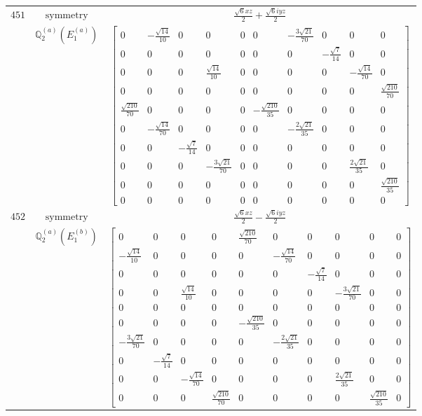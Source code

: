 \documentclass[fleqn,8pt,landscape]{jsarticle}
\begin{document}
\begin{longtable}{ccc}
$ 451 $ & $ \text{symmetry} $ & $ \frac{\sqrt{6} x z}{2} + \frac{\sqrt{6} i y z}{2} $ \\
$  $ & $ \mathbb{Q}_{2}^{(a)}(E_{1}^{(a)}) $ & $ \begin{bmatrix} 0 & - \frac{\sqrt{14}}{10} & 0 & 0 & 0 & 0 & - \frac{3 \sqrt{21}}{70} & 0 & 0 & 0 \\ 0 & 0 & 0 & 0 & 0 & 0 & 0 & - \frac{\sqrt{7}}{14} & 0 & 0 \\ 0 & 0 & 0 & \frac{\sqrt{14}}{10} & 0 & 0 & 0 & 0 & - \frac{\sqrt{14}}{70} & 0 \\ 0 & 0 & 0 & 0 & 0 & 0 & 0 & 0 & 0 & \frac{\sqrt{210}}{70} \\ \frac{\sqrt{210}}{70} & 0 & 0 & 0 & 0 & - \frac{\sqrt{210}}{35} & 0 & 0 & 0 & 0 \\ 0 & - \frac{\sqrt{14}}{70} & 0 & 0 & 0 & 0 & - \frac{2 \sqrt{21}}{35} & 0 & 0 & 0 \\ 0 & 0 & - \frac{\sqrt{7}}{14} & 0 & 0 & 0 & 0 & 0 & 0 & 0 \\ 0 & 0 & 0 & - \frac{3 \sqrt{21}}{70} & 0 & 0 & 0 & 0 & \frac{2 \sqrt{21}}{35} & 0 \\ 0 & 0 & 0 & 0 & 0 & 0 & 0 & 0 & 0 & \frac{\sqrt{210}}{35} \\ 0 & 0 & 0 & 0 & 0 & 0 & 0 & 0 & 0 & 0 \end{bmatrix} $ \\ \hline
$ 452 $ & $ \text{symmetry} $ & $ \frac{\sqrt{6} x z}{2} - \frac{\sqrt{6} i y z}{2} $ \\
$  $ & $ \mathbb{Q}_{2}^{(a)}(E_{1}^{(b)}) $ & $ \begin{bmatrix} 0 & 0 & 0 & 0 & \frac{\sqrt{210}}{70} & 0 & 0 & 0 & 0 & 0 \\ - \frac{\sqrt{14}}{10} & 0 & 0 & 0 & 0 & - \frac{\sqrt{14}}{70} & 0 & 0 & 0 & 0 \\ 0 & 0 & 0 & 0 & 0 & 0 & - \frac{\sqrt{7}}{14} & 0 & 0 & 0 \\ 0 & 0 & \frac{\sqrt{14}}{10} & 0 & 0 & 0 & 0 & - \frac{3 \sqrt{21}}{70} & 0 & 0 \\ 0 & 0 & 0 & 0 & 0 & 0 & 0 & 0 & 0 & 0 \\ 0 & 0 & 0 & 0 & - \frac{\sqrt{210}}{35} & 0 & 0 & 0 & 0 & 0 \\ - \frac{3 \sqrt{21}}{70} & 0 & 0 & 0 & 0 & - \frac{2 \sqrt{21}}{35} & 0 & 0 & 0 & 0 \\ 0 & - \frac{\sqrt{7}}{14} & 0 & 0 & 0 & 0 & 0 & 0 & 0 & 0 \\ 0 & 0 & - \frac{\sqrt{14}}{70} & 0 & 0 & 0 & 0 & \frac{2 \sqrt{21}}{35} & 0 & 0 \\ 0 & 0 & 0 & \frac{\sqrt{210}}{70} & 0 & 0 & 0 & 0 & \frac{\sqrt{210}}{35} & 0 \end{bmatrix} $ \\ \hline

\end{longtable}
\end{document}
